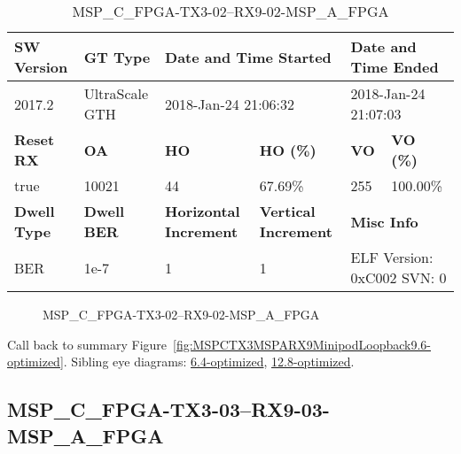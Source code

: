 \begin{table}[h]
\centering
\caption{MSP\_C\_FPGA-TX3-02--RX9-02-MSP\_A\_FPGA}
\label{tab:MSPCFPGATX302RX902MSPAFPGA9.6-optimized}
\begin{tabular}{@{}|l|l|l|l|l|l|@{}}
\toprule
\textbf{SW Version}                & \textbf{GT Type}   & \multicolumn{2}{l|}{\textbf{Date and Time Started}}            & \multicolumn{2}{l|}{\textbf{Date and Time Ended}}        \\ \midrule
2017.2                       & UltraScale GTH          & \multicolumn{2}{l|}{2018-Jan-24 21:06:32}                   & \multicolumn{2}{l|}{2018-Jan-24 21:07:03}               \\ \midrule
\textbf{Reset RX}                  & \textbf{OA} & \textbf{HO}   & \textbf{HO (\%)} & \textbf{VO} & \textbf{VO (\%)} \\ \midrule
true & 10021        & 44          & 67.69\%        & 255        & 100.00\%       \\ \midrule
\textbf{Dwell Type}                & \textbf{Dwell BER} & \textbf{Horizontal Increment} & \textbf{Vertical Increment}    & \multicolumn{2}{l|}{\textbf{Misc Info}}                  \\ \midrule
BER                            & 1e-7        & 1        & 1           & \multicolumn{2}{l|}{ELF Version: 0xC002 SVN: 0}                         \\ \bottomrule
\end{tabular}
\end{table}

\begin{figure}[h]
\caption{MSP\_C\_FPGA-TX3-02--RX9-02-MSP\_A\_FPGA} \label{fig:MSPCFPGATX302RX902MSPAFPGA9.6-optimized}
\end{figure}

Call back to summary Figure~\ref{fig:MSPCTX3MSPARX9MinipodLoopback9.6-optimized}.
Sibling eye diagrams: \hyperref[sec:MSPCFPGATX302RX902MSPAFPGA6.4-optimized]{6.4-optimized}, \hyperref[sec:MSPCFPGATX302RX902MSPAFPGA12.8-optimized]{12.8-optimized}.

\clearpage
\newpage


\subsection{MSP\_C\_FPGA-TX3-03--RX9-03-MSP\_A\_FPGA}\label{sec:MSPCFPGATX303RX903MSPAFPGA9.6-optimized}

